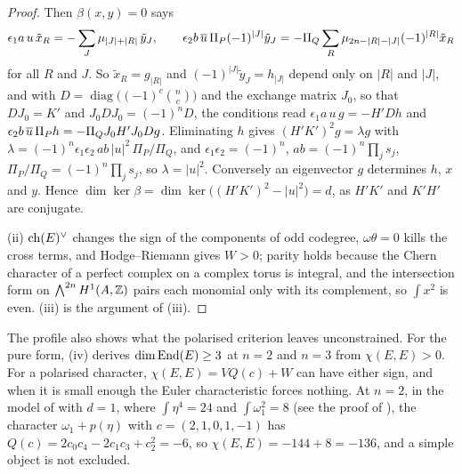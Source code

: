 \begin{proof}
Then $\beta(x,y)=0$ says
\[
  \epsilon_{1}a\,u\,\tilde x_{R}=-\sum_{J}\mu_{|J|+|R|}\,\tilde y_{J},
  \qquad
  \epsilon_{2}b\,\overline{u}\,\Pi_{P}(-1)^{|J|}\tilde y_{J}
  =-\Pi_{Q}\sum_{R}\mu_{2n-|R|-|J|}(-1)^{|R|}\tilde x_{R}
\]
for all $R$ and $J$. So $\tilde x_{R}=g_{|R|}$ and $(-1)^{|J|}\tilde y_{J}=h_{|J|}$
depend only on $|R|$ and $|J|$, and with $D=\operatorname{diag}\bigl((-1)^{c}
\binom{n}{c}\bigr)$ and the exchange matrix $J_{0}$, so that $DJ_{0}=K'$ and
$J_{0}DJ_{0}=(-1)^{n}D$, the conditions read
$\epsilon_{1}a\,u\,g=-H'Dh$ and $\epsilon_{2}b\,\overline{u}\,\Pi_{P}h=-\Pi_{Q}
J_{0}H'J_{0}Dg$. Eliminating $h$ gives $(H'K')^{2}g=\lambda g$ with
$\lambda=(-1)^{n}\epsilon_{1}\epsilon_{2}\,ab\,|u|^{2}\,\Pi_{P}/\Pi_{Q}$, and
$\epsilon_{1}\epsilon_{2}=(-1)^{n}$, $ab=(-1)^{n}\prod_{j}s_{j}$,
$\Pi_{P}/\Pi_{Q}=(-1)^{n}\prod_{j}s_{j}$, so $\lambda=|u|^{2}$. Conversely an
eigenvector $g$ determines $h$, $x$ and $y$. Hence $\dim\ker\beta=
\dim\ker\bigl((H'K')^{2}-|u|^{2}\bigr)=d$, as $H'K'$ and $K'H'$ are
conjugate.

(ii) $\operatorname{ch}(E)^{\vee}$ changes the sign of
the components of odd codegree, $\omega\theta=0$ kills the cross terms, and
Hodge--Riemann gives $W>0$; parity holds because the Chern character of a
perfect complex on a complex torus is integral, and the intersection form on
$\bigwedge^{2n}H^{1}(A,\mathbb{Z})$ pairs each monomial only with its complement, so
$\int x^{2}$ is even. (iii) is the argument of (iii).
\end{proof}

The profile also shows what the polarised criterion leaves unconstrained. For
the pure form, (iv) derives $\dim\operatorname{End}(E)\ge3$ at $n=2$ and
$n=3$ from $\chi(E,E)>0$. For a polarised character, $\chi(E,E)=VQ(c)+W$ can
have either sign, and when it is small enough the Euler characteristic forces
nothing. At $n=2$, in the model of  with $d=1$, where
$\int\eta^{4}=24$ and $\int\omega_{1}^{2}=8$ (see the proof of
), the character $\omega_{1}+p(\eta)$ with
$c=(2,1,0,1,-1)$ has $Q(c)=2c_{0}c_{4}-2c_{1}c_{3}+c_{2}^{2}=-6$, so
$\chi(E,E)=-144+8=-136$, and a simple object is not excluded.

